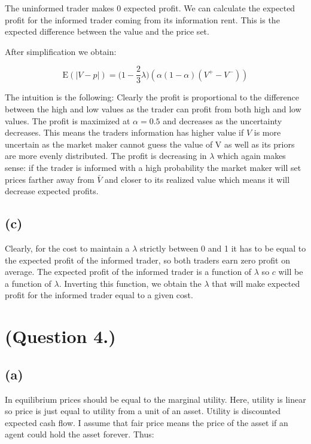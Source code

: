 \documentclass{article}
\begin{document}
The uninformed trader makes 0 expected profit. We can calculate the expected profit for the informed trader coming from its information rent. This is the expected difference between the value and the price set.

After simplification we obtain:

\begin{equation}
\mathrm{E}(\vert V - p \vert) = \bigg(1-\frac{2}{3}\lambda\bigg)(\alpha(1-\alpha)(V^+-V^-))
\end{equation}

The intuition is the following: Clearly the profit is proportional to the difference between the high and low values as the trader can profit from both high and low values. The profit is maximized at $\alpha = 0.5$ and decreases as the uncertainty decreases. This means the traders information has higher value if $V$ is more uncertain as the market maker cannot guess the value of V as well as its priors are more evenly distributed. The profit is decreasing in $\lambda$ which again makes sense: if the trader is informed with a high probability the market maker will set prices farther away from $\bar{V}$ and closer to its realized value which means it will decrease expected profits.

\subsection{(c)}

Clearly, for the cost to maintain a $\lambda$ strictly between 0 and 1 it has to be equal to the expected profit of the informed trader, so both traders earn zero profit on average. The expected profit of the informed trader is a function of $\lambda$ so $c$ will be a function of $\lambda$. Inverting this function, we obtain the $\lambda$ that will make expected profit for the informed trader equal to a given cost.

\section{(Question 4.)}

\subsection{(a)}

In equilibrium prices should be equal to the marginal utility. Here, utility is linear so  price is just equal to utility from a unit of an asset. Utility is discounted expected cash flow. I assume that fair price means the price of the asset if an agent could hold the asset forever. Thus:
\end{document}
